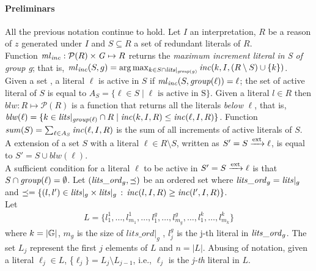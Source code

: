 \paragraph*{Preliminars} All the previous notation continue to hold.
Let $I$ an interpretation, $R$ be a reason of $z$ generated under $I$ 
and $S \subseteq R$ a set of redundant literals of $R$.\\
Function $\mathit{\mathit{ml}_{\mathit{inc}}} : \mathcal{P}(R) \times \mathit{G} \mapsto R$ 
returns the \textit{maximum increment literal in S of group g};
that is, 
$\mathit{ml}_{\mathit{inc}}(S,g)= \arg\max_{k \in S \cap \mathit{lits}|_{{\mathit{group}(g)}}} \mathit{inc}(k,I,(R \setminus S) \cup \{k\} )$.\\   
Given a set , a literal $\ell$ is active in $S$ if $\mathit{ml}_{\mathit{inc}}(S,\mathit{group}(\ell)) = \ell$;
the set of active literal of $S$ is equal to $A_S = \{\ell \in S \mid \ell \text{ is active in S}\}$.
Given a literal $l \in R$ then $blw: R \mapsto \mathcal{P}(R)$ is a function 
that returns all the literals \textit{below} $\ell$, 
that is, $\mathit{blw}(\ell) = \{ k \in \mathit{lits}|_{\mathit{group}(\ell)} \cap R \mid \mathit{inc}(k,I,R) \le \mathit{inc}(\ell,I,R) \}$.
Function $\mathit{sum}(S) = \sum_{\ell \in A_S} \mathit{inc}(\ell,I,R)$ is the sum of all increments  
of active literals of $S$.\\
A extension of a set $S$ with a literal $\ell \in R \setminus S$, written as $S' = S \xrightarrow{\text{ext}} \ell$,
is equal to $S' = S \cup blw(\ell)$.\\
A sufficient condition for a literal $\ell$ 
to be active in $S' = S \xrightarrow{\text{ext}} \ell$ is that 
$S \cap \mathit{group}(\ell) = \emptyset$.
Let $(\mathit{lits}\_\mathit{ord}_g, \preceq)$ be an ordered set where $\mathit{lits}\_\mathit{ord}_g = \mathit{lits}|_g$
and $\preceq = \{(l,l') \in \mathit{lits}|_g \times \mathit{lits}|_g \,:\, \mathit{inc}(l,I,R) \ge \mathit{inc}(l',I,R)\}$.\\
Let 
\begin{align}
    \label{eq:L}
    L = \{l^1_1,\hdots,l^1_{m_1},\hdots,l^g_1,\hdots,l^g_{m_g},\hdots,l^k_1,\hdots,l^k_{m_k} \}
\end{align}
where $k = |\mathbb{G}|$, $m_g$ is the size of $lits\_\mathit{ord}|_g$ , $l^g_j$ is the j-th literal in $\mathit{lits}\_\mathit{ord}_{g}$.
The set $L_j$ represent the first $j$ elements of $L$ and $n = |L|$.
Abusing of notation, given a literal $\ell_j \in L$, \{$\ell_j\} = L_j \setminus L_{j-1}$, i.e., $\ell_j$
is the \textit{j-th} literal in $L$.

